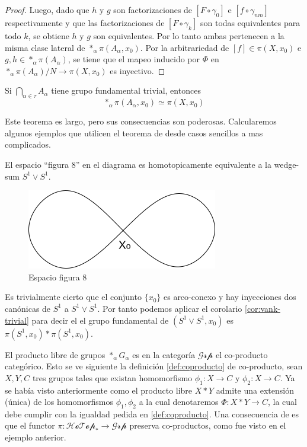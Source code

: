 \begin{proof}
  Luego, dado que \(h\) y \(g\) son factorizaciones de \([F \circ
  \gamma_0]\) e \([f \circ \gamma_{nm}]\) respectivamente y que las
  factorizaciones de \([F \circ \gamma_k]\) son todas equivalentes para
  todo \(k\), se obtiene \(h\) y \(g\) son equivalentes. Por lo tanto
  ambas pertenecen a la misma clase lateral de \(*_\alpha \pi (A_\alpha ,
  x_0)\). Por la arbitrariedad de \([f] \in \pi (X, x_0)\) e \(g,h \in
  *_\alpha \pi (A_\alpha)\), se tiene que el mapeo inducido por \(\Phi\)
  en \(*_\alpha \pi (A_\alpha) / N \to \pi (X,x_0)\) es inyectivo.
\end{proof}
\begin{corolario} \label{cor:vank-trivial}
  Si \(\bigcap_{\alpha \in \tau} A_\alpha \) tiene grupo fundamental
  trivial, entonces
  \[ *_\alpha \pi (A_\alpha , x_0) \simeq \pi (X, x_0) \]
\end{corolario}

Este teorema es largo, pero sus consecuencias son poderosas.
Calcularemos algunos ejemplos que utilicen el teorema de \vank desde
casos sencillos a mas complicados.

\begin{ejemplo}
El espacio ``figura 8'' en el diagrama es homotopicamente equivalente a
la wedge-sum \(S^1 \vee S^1\).
  \begin{figure}[h]
    \centering \includegraphics[scale=0.5]{./imagenes/figura8.png}
    \caption*{Espacio figura 8}
  \end{figure}
  Es trivialmente cierto que el conjunto \(\{x_0\}\) es arco-conexo y
  hay inyecciones dos canónicas de \(S^1\) a \(S^1 \vee S^1\). Por tanto
  podemos aplicar el corolario \ref{cor:vank-trivial} para decir el el
  grupo fundamental de \(\left( S^1 \vee S^1 , x_0 \right) \) es \(\pi
  \left( S^1 , x_0 \right) * \pi \left( S^1 , x_0 \right) \).
\end{ejemplo}

El producto libre de grupos \(*_\alpha G_\alpha\) es en la categoría
\(\mathcal{Grp}\) el co-producto categórico. Esto se ve siguiente la
definición \ref{def:coproducto} de co-producto, sean \(X,Y,C\) tres grupos
tales que existan homomorfismo \(\phi_1 : X \to C\) y \(\phi_2 : X \to
C\). Ya se había visto anteriormente como el producto libre \(X * Y\)
admite una extensión (única) de los homomorfismos \(\phi_1, \phi_2\) a
la cual denotaremos \(\Phi : X * Y \to C\), la cual debe cumplir con la
igualdad pedida en \ref{def:coproducto}. Una consecuencia de \vank es
que el functor \(\pi : \mathscr{HoTop}_* \to \mathscr{Grp}\) preserva
co-productos, como fue visto en el ejemplo anterior.

